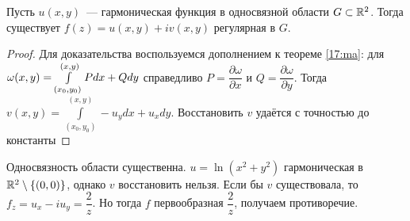 \begin{statement}
    Пусть \(u(x, y)\)~--- гармоническая функция в односвязной области \(G \subset \mathbb{R}^2\). Тогда
    существует \(f(z) = u(x, y) + iv(x, y)\) регулярная в \(G\).
\end{statement}

\begin{proof}
    Для доказательства воспользуемся дополнением к теореме \ref{17:ma}: для \(\omega(x, y) \hm=
    \int\limits_{(x_0, y_0)}^{(x, y)} Pdx + Qdy\) справедливо \(P = \dfrac{\partial \omega}{\partial
    x}\) и \(Q = \dfrac{\partial \omega}{\partial y}\). Тогда \(v(x, y) =
    \int\limits_{(x_0, y_0)}^{(x, y)} -u_ydx + u_xdy\). Восстановить \(v\) удаётся с точностью до
    константы
\end{proof}

\begin{note}
    Односвязность области существенна. \(u = \ln{(x^2 + y^2)}\) гармоническая в \(\mathbb{R}^2 \setminus
    \{(0, 0)\}\), однако \(v\) восстановить нельзя. Если бы \(v\) существовала, то \(f_z = u_x -
    iu_y = \dfrac{2}{z}\). Но тогда \(f\) первообразная \(\dfrac{2}{z}\), получаем противоречие.
\end{note}
